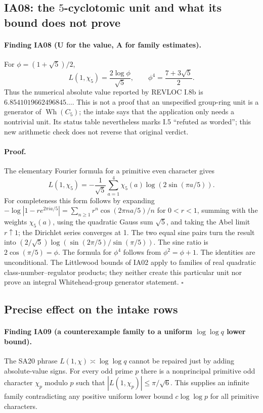 \documentclass[11pt,a4paper]{article}
\theoremstyle{definition}
\begin{document}
\subsection{IA08: the $5$-cyclotomic unit and what its bound does not prove}

\paragraph{Finding IA08 (U for the value, A for family estimates).}
For $\phi=(1+\sqrt5)/2$,
\[
             L(1,\chi_5)=\frac{2\log\phi}{\sqrt5},\qquad
             \phi^4=\frac{7+3\sqrt5}{2}.
\]
Thus the numerical absolute value reported by REVLOC I.8b is
$6.8541019662496845\ldots$.  This is not a proof that an unspecified
group-ring unit is a generator of $\operatorname{Wh}(C_5)$; the
intake says that the application only needs a nontrivial unit.
Its status table nevertheless marks I.5 ``refuted as worded'';
this new arithmetic check does not reverse that original verdict.

\paragraph{Proof.}
The elementary Fourier formula for a primitive even character gives
\[
 L(1,\chi_5)=-\frac1{\sqrt5}
       \sum_{a=1}^4\chi_5(a)\log(2\sin(\pi a/5)).
\]
For completeness this form follows by expanding
$-\log|1-re^{2\pi ia/5}|=\sum_{n\geq1}r^n
\cos(2\pi na/5)/n$ for $0<r<1$, summing with the weights
$\chi_5(a)$, using the quadratic Gauss sum $\sqrt5$, and taking
the Abel limit $r\uparrow1$; the Dirichlet series converges at 1.
The two equal sine pairs turn the result into
$(2/\sqrt5)\log(\sin(2\pi/5)/\sin(\pi/5))$.
The sine ratio is $2\cos(\pi/5)=\phi$.
The formula for $\phi^4$ follows from $\phi^2=\phi+1$.
The identities are unconditional.  The Littlewood bounds of IA02
apply to families of real quadratic class-number--regulator products;
they neither create this particular unit nor prove an integral
Whitehead-group generator statement. \hfill$\square$

\subsection{Precise effect on the intake rows}

\paragraph{Finding IA09 (a counterexample family to a uniform
$\log\log q$ lower bound).}
The SA20 phrase $L(1,\chi)\asymp\log\log q$ cannot be repaired just
by adding absolute-value signs.  For every odd prime $p$ there is a
nonprincipal primitive odd character $\chi_p$ modulo $p$ such that
$|L(1,\chi_p)|\leq\pi/\sqrt6$.  This supplies an infinite family
contradicting any positive uniform lower bound
$c\log\log p$ for all primitive characters.
\end{document}

